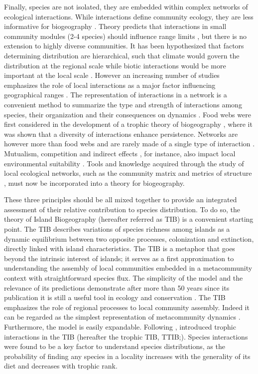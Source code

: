 Finally, species are not isolated, they are embedded within complex networks of ecological interactions. While interactions define community ecology, they are less informative for biogeography \citep{Peterson2003}. Theory predicts that interactions in small community modules (2-4 species) should influence range limits \citep{Gilman2010}, but there is no extension to highly diverse communities. It has been hypothesized that factors determining distribution are hierarchical, such that climate would govern the distribution at the regional scale while biotic interactions would be more important at the local scale \citep{Araujo2014}. However an increasing number of studies emphasizes the role of local interactions as a major factor influencing geographical ranges \citep{Jabot2012, Gotelli2010}. The representation of interactions in a network is a convenient method to summarize the type and strength of interactions among species, their organization \citep{Proulx2005} and their consequences on dynamics \citep{Allesina2012a}. Food webs were first considered in the development of a trophic theory of biogeography \citep{Gravel2011}, where it was shown that a diversity of interactions enhance persistence. Networks are however more than food webs and are rarely made of a single type of interaction \citep{Kefi2012}. Mutualism, competition and indirect effects \citep{Wootton1994}, for instance, also impact local environmental suitability \citep{Godsoe2012}. Tools and knowledge acquired through the study of local ecological networks, such as the community matrix and metrics of structure \citep{Allesina2012a}, must now be incorporated into a theory for biogeography.

These three principles should be all mixed together to provide an integrated assessment of their relative contribution to species distribution. To do so, the theory of Island Biogeography (hereafter referred as TIB) \citep{MacArthur1967, Warren2015} is a convenient starting point. The TIB describes variations of species richness among islands as a dynamic equilibrium between two opposite processes, colonization and extinction, directly linked with island characteristics. The TIB is a metaphor that goes beyond the intrinsic interest of islands; it serves as a first approximation to understanding the assembly of local communities embedded in a metacommunity context with straightforward species flux. The simplicity of the model and the relevance of its predictions demonstrate after more than 50 years since its publication it is still a useful tool in ecology and conservation \citep{Cook2002, Warren2015}. The TIB emphasizes the role of regional processes to local community assembly. Indeed it can be regarded as the simplest representation of metacommunity dynamics \citep{Leibold2004}. Furthermore, the model is easily expandable. Following \cite{Holt2009}, \cite{Gravel2011} introduced trophic interactions in the TIB (hereafter the trophic TIB, TTIB;). Species interactions were found to be a key factor to understand species distributions, as the probability of finding any species in a locality increases with the generality of its diet and decreases with trophic rank.

